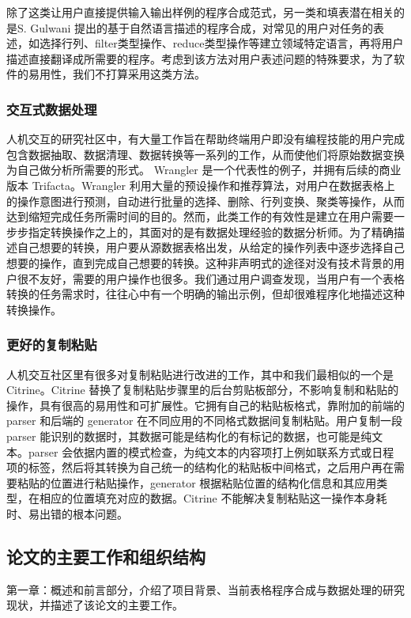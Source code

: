 \documentclass[design, pageheader]{njubachelor}
\begin{document}
除了这类让用户直接提供输入输出样例的程序合成范式，另一类和填表潜在相关的是S. Gulwani 提出的基于自然语言描述的程序合成\cite{gulwani14}，对常见的用户对任务的表述，如选择行列、filter类型操作、reduce类型操作等建立领域特定语言，再将用户描述直接翻译成所需要的程序。考虑到该方法对用户表述问题的特殊要求，为了软件的易用性，我们不打算采用这类方法。

\subsubsection{交互式数据处理}
人机交互的研究社区中，有大量工作旨在帮助终端用户即没有编程技能的用户完成包含数据抽取、数据清理、数据转换等一系列的工作，从而使他们将原始数据变换为自己做分析所需要的形式。 Wrangler\cite{kandel11} 是一个代表性的例子，并拥有后续的商业版本 Trifacta。Wrangler 利用大量的预设操作和推荐算法，对用户在数据表格上的操作意图进行预测，自动进行批量的选择、删除、行列变换、聚类等操作，从而达到缩短完成任务所需时间的目的。然而，此类工作的有效性是建立在用户需要一步步指定转换操作之上的，其面对的是有数据处理经验的数据分析师。为了精确描述自己想要的转换，用户要从源数据表格出发，从给定的操作列表中逐步选择自己想要的操作，直到完成自己想要的转换。这种非声明式的途径对没有技术背景的用户很不友好，需要的用户操作也很多。我们通过用户调查发现，当用户有一个表格转换的任务需求时，往往心中有一个明确的输出示例，但却很难程序化地描述这种转换操作。

\subsubsection{更好的复制粘贴}
人机交互社区里有很多对复制粘贴进行改进的工作，其中和我们最相似的一个是Citrine。Citrine \cite{stylos04} 替换了复制粘贴步骤里的后台剪贴板部分，不影响复制和粘贴的操作，具有很高的易用性和可扩展性。它拥有自己的粘贴板格式，靠附加的前端的 parser 和后端的 generator 在不同应用的不同格式数据间复制粘贴。用户复制一段 parser 能识别的数据时，其数据可能是结构化的有标记的数据，也可能是纯文本。parser 会依据内置的模式检查，为纯文本的内容项打上例如联系方式或日程项的标签，然后将其转换为自己统一的结构化的粘贴板中间格式，之后用户再在需要粘贴的位置进行粘贴操作，generator 根据粘贴位置的结构化信息和其应用类型，在相应的位置填充对应的数据。Citrine 不能解决复制粘贴这一操作本身耗时、易出错的根本问题。

\subsection{论文的主要工作和组织结构}

第一章：概述和前言部分，介绍了项目背景、当前表格程序合成与数据处理的研究现状，并描述了该论文的主要工作。
\end{document}
